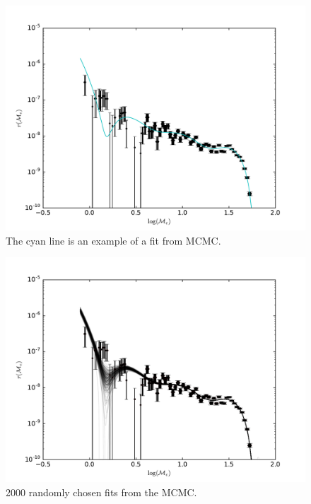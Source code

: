 \begin{figure}[ht]
  \includegraphics[width=\textwidth]{img/line-MCMC.pdf}
  \caption{The cyan line is an example of a fit from MCMC.}
  \label{fig:line_MCMC}
\end{figure}

\begin{figure}[ht]
  \includegraphics[width=\textwidth]{img/line-mcmc_err.pdf}
  \caption{2000 randomly chosen fits from the MCMC.}
  \label{fig:line_MCMC_err}
\end{figure}

